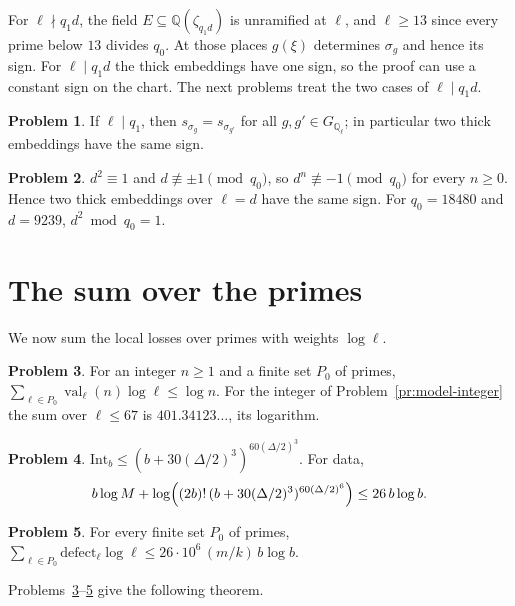 \documentclass[reqno]{amsart}
\theoremstyle{definition}
\newtheorem{problem}{Problem}[section]
\theoremstyle{plain}
\newcommand{\Q}{\mathbb{Q}}
\newcommand{\val}{\operatorname{val}}
\newcommand{\defect}{\mathrm{defect}}
\newcommand{\Int}{\mathrm{Int}}
\newcommand{\Gl}{G_{\Q_\ell}}
\newcommand{\half}{(\Delta/2)}
\begin{document}
For \(\ell \nmid q_1d\), the field \(E \subseteq \Q(\zeta_{q_1d})\) is unramified at \(\ell\), and \(\ell\ge13\) since every prime below \(13\) divides \(q_0\).  At those places \(g(\xi)\) determines \(\sigma_g\) and hence its sign.  For \(\ell\mid q_1d\) the thick embeddings have one sign, so the proof can use a constant sign on the chart.  The next problems treat the two cases of \(\ell\mid q_1d\).

\begin{problem}\label{pr:sign-q1}
If \(\ell \mid q_1\), then \(s_{\sigma_g} = s_{\sigma_{g'}}\) for all \(g, g' \in \Gl\); in particular two thick embeddings have the same sign.
\end{problem}

\begin{problem}\label{pr:sign-d}
\(d^2 \equiv 1\) and \(d \not\equiv \pm1 \pmod{q_0}\), so \(d^n \not\equiv -1 \pmod{q_0}\) for every \(n \ge 0\).  Hence two thick embeddings over \(\ell = d\) have the same sign.  For \(q_0 = 18480\) and \(d = 9239\), \(d^2 \bmod q_0 = 1\).
\end{problem}

\section{The sum over the primes}\label{sec:sum}

We now sum the local losses over primes with weights \(\log\ell\).

\begin{problem}\label{pr:sum-log}
For an integer \(n \ge 1\) and a finite set \(P_0\) of primes, \(\sum_{\ell \in P_0} \val_\ell(n)\log\ell \le \log n\).  For the integer of Problem~\ref{pr:model-integer} the sum over \(\ell \le 67\) is \(401.34123\ldots\), its logarithm.
\end{problem}

\begin{problem}\label{pr:int-bound}
\(\Int_b \le (b + 30\half^3)^{60\half^3}\).  For data,
\[
  b\log M + \log\Bigl((2b)!\,(b + 30\half^3)^{60\half^6}\Bigr) \le 26\, b\log b .
\]
\end{problem}

\begin{problem}\label{pr:defect-sum}
For every finite set \(P_0\) of primes, \(\sum_{\ell \in P_0}\defect_\ell\log\ell \le 26\cdot 10^6\,(m/k)\,b\log b\).
\end{problem}

Problems~\ref{pr:sum-log}--\ref{pr:defect-sum} give the following theorem.
\end{document}
